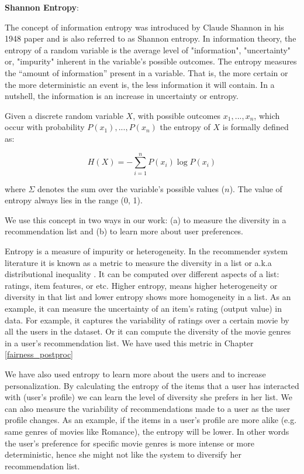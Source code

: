 
        \textbf{Shannon Entropy}:
        
        The concept of information entropy was introduced by Claude Shannon in his 1948 paper \cite{entropy1948} and is also referred to as Shannon entropy. In information theory, the entropy of a random variable is the average level of "information", "uncertainty" or, "impurity" inherent in the variable's possible outcomes. The entropy measures the “amount of information” present in a variable. That is, the more certain or the more deterministic an event is, the less information it will contain. In a nutshell, the information is an increase in uncertainty or entropy. 
        
        Given a discrete random variable $X$, with possible outcomes $x_{1},...,x_{n}$, which occur with probability $P(x_1),...,P(x_n)$
         the entropy of $X$ is formally defined as:
         
         \begin{equation}
            H(X)=-\sum_{i=1}^{n}P(x_{i})\log P(x_{i})
         \end{equation}

        where $\Sigma$ denotes the sum over the variable's possible values ($n$). The value of entropy always lies in the range (0, 1).
        
        We use this concept in two ways in our work: (a) to measure the diversity in a recommendation list and (b) to learn more about user preferences.
        
        Entropy is a measure of impurity or heterogeneity. In the recommender system literature it is known as a metric to measure the diversity in a list or a.k.a distributional inequality . It can be computed over different aspects of a list: ratings, item features, or etc.
        Higher entropy, means higher heterogeneity or diversity in that list and lower entropy shows more homogeneity in a list. As an example, it can measure the uncertainty of an item’s rating (output value) in data. For example, it captures the variability of ratings over a certain movie by all the users in the dataset. Or it can compute the diversity of the movie genres in a user's recommendation list. We have used this metric in Chapter \ref{fairness_postproc} 
        
        We have also used entropy to learn more about the users and to increase personalization. By calculating the entropy of the items that a user has interacted with (user's profile) we can learn the level of diversity she prefers in her list. We can also measure the variability of recommendations made to a user as the user profile changes. 
        As an example, if the items in a user's profile are more alike (e.g. same genres of movies like Romance), the entropy will be lower. In other words the user's preference for specific movie genres is more intense or more deterministic, hence she might not like the system to diversify her recommendation list.
        
